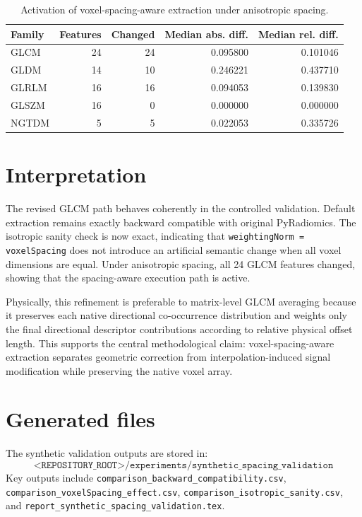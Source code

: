 \documentclass[11pt,a4paper]{article}
\begin{document}
\begin{table}[h]
\centering
\caption{Activation of voxel-spacing-aware extraction under anisotropic spacing.}
\begin{tabular}{lrrrr}
\toprule
Family & Features & Changed & Median abs. diff. & Median rel. diff. \\
\midrule
GLCM & 24 & 24 & 0.095800 & 0.101046 \\
GLDM & 14 & 10 & 0.246221 & 0.437710 \\
GLRLM & 16 & 16 & 0.094053 & 0.139830 \\
GLSZM & 16 & 0 & 0.000000 & 0.000000 \\
NGTDM & 5 & 5 & 0.022053 & 0.335726 \\
\bottomrule
\end{tabular}
\end{table}

\section*{Interpretation}
The revised GLCM path behaves coherently in the controlled validation. Default extraction remains exactly backward compatible with original PyRadiomics. The isotropic sanity check is now exact, indicating that \texttt{weightingNorm = voxelSpacing} does not introduce an artificial semantic change when all voxel dimensions are equal. Under anisotropic spacing, all 24 GLCM features changed, showing that the spacing-aware execution path is active.

Physically, this refinement is preferable to matrix-level GLCM averaging because it preserves each native directional co-occurrence distribution and weights only the final directional descriptor contributions according to relative physical offset length. This supports the central methodological claim: voxel-spacing-aware extraction separates geometric correction from interpolation-induced signal modification while preserving the native voxel array.

\section*{Generated files}
The synthetic validation outputs are stored in:
\[
\texttt{<REPOSITORY_ROOT>/experiments/synthetic\_spacing\_validation}
\]
Key outputs include \texttt{comparison\_backward\_compatibility.csv}, \texttt{comparison\_voxelSpacing\_effect.csv}, \texttt{comparison\_isotropic\_sanity.csv}, and \texttt{report\_synthetic\_spacing\_validation.tex}.
\end{document}
